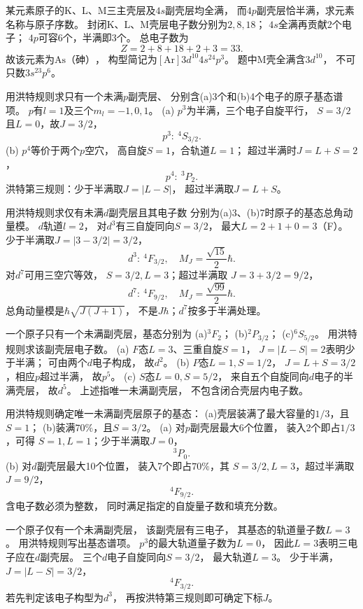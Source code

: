 某元素原子的K、L、M三主壳层及$4s$副壳层均全满，
而$4p$副壳层恰半满，求元素名称与原子序数。
\exsolution
封闭K、L、M壳层电子数分别为$2,8,18$；
$4s$全满再贡献2个电子；
$4p$可容6个，半满即3个。
总电子数为
\[
 Z=2+8+18+2+3=\boxed{33}.
\]
故该元素为$\boxed{\mathrm{As}\text{（砷）}}$，
构型简记为$[\mathrm{Ar}]3d^{10}4s^24p^3$。
\excheck 题中M壳全满含$3d^{10}$，
不可只数$3s^23p^6$。

用洪特规则求只有一个未满$p$副壳层、
分别含(a)3个和(b)4个电子的原子基态谱项。
\exsolution
$p$有$l=1$及三个$m_l=-1,0,1$。
(a) $p^3$为半满，三个电子自旋平行，
$S=3/2$且$L=0$，故$J=3/2$，
\[
 \boxed{p^3:\ {}^{4}S_{3/2}}.
\]
(b) $p^4$等价于两个$p$空穴，
高自旋$S=1$，合轨道$L=1$；
超过半满时$J=L+S=2$，
\[
 \boxed{p^4:\ {}^{3}P_2}.
\]
\excheck 洪特第三规则：少于半满取$J=|L-S|$，
超过半满取$J=L+S$。

用洪特规则求仅有未满$d$副壳层且其电子数
分别为(a)3、(b)7时原子的基态总角动量模。
\exsolution
$d$轨道$l=2$，
对$d^3$有三自旋同向$S=3/2$，
最大$L=2+1+0=3$（F）。
少于半满取$J=|3-3/2|=3/2$，
\[
 \boxed{d^3:\ {}^{4}F_{3/2},\quad
 M_J=\frac{\sqrt{15}}2\hbar}.
\]
对$d^7$可用三空穴等效，
$S=3/2,L=3$；超过半满取
$J=3+3/2=9/2$，
\[
 \boxed{d^7:\ {}^{4}F_{9/2},\quad
 M_J=\frac{\sqrt{99}}2\hbar}.
\]
\excheck 总角动量模是$\hbar\sqrt{J(J+1)}$，
不是$J\hbar$；$d^7$按多于半满处理。

一个原子只有一个未满副壳层，基态分别为
(a)\({}^{3}F_2\)；
(b)\({}^{2}P_{3/2}\)；
(c)\({}^{6}S_{5/2}\)。
用洪特规则求该副壳层电子数。
\exsolution
(a) $F$态$L=3$、三重自旋$S=1$，
$J=|L-S|=2$表明少于半满；
可由两个$d$电子构成，
故$\boxed{d^2}$。
(b) $P$态$L=1,S=1/2$，
$J=L+S=3/2$，相应$p$超过半满，
故$\boxed{p^5}$。
(c) $S$态$L=0,S=5/2$，
来自五个自旋同向$d$电子的半满壳层，
故$\boxed{d^5}$。
\excheck 上述指唯一未满副壳层，
不包含闭合壳层内电子数。

用洪特规则确定唯一未满副壳层原子的基态：
(a)壳层装满了最大容量的$1/3$，且$S=1$；
(b)装满$70\%$，且$S=3/2$。
\exsolution
(a) 对$p$副壳层最大6个位置，
装入2个即占$1/3$，可得
$S=1,L=1$；少于半满取$J=0$，
\[
 \boxed{{}^{3}P_0}.
\]
(b) 对$d$副壳层最大10个位置，
装入7个即占$70\%$，其
$S=3/2,L=3$，超过半满取$J=9/2$，
\[
 \boxed{{}^{4}F_{9/2}}.
\]
\excheck 含电子数必须为整数，
同时满足指定的自旋量子数和填充分数。

一个原子仅有一个未满副壳层，
该副壳层有三电子，
其基态的轨道量子数$L=3$。
用洪特规则写出基态谱项。
\exsolution
$p^3$的最大轨道量子数为$L=0$，
因此$L=3$表明三电子应在$d$副壳层。
三个$d$电子自旋同向$S=3/2$，
最大轨道$L=3$。
少于半满，$J=|L-S|=3/2$，
\[
 \boxed{{}^{4}F_{3/2}}.
\]
\excheck 若先判定该电子构型为$d^3$，
再按洪特第三规则即可确定下标$J$。

